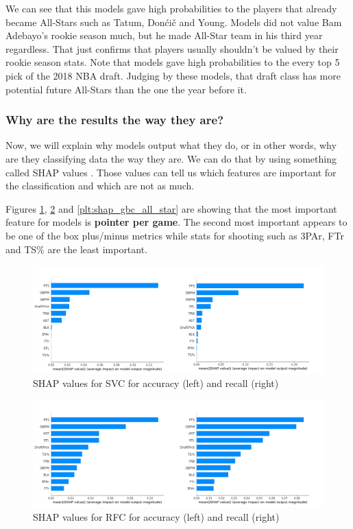 \documentclass[a4paper]{article}
\begin{document}
We can see that this models gave high probabilities to the players that already became All-Stars such as Tatum, Donćič and Young. Models did not value Bam Adebayo's rookie season much, but he made All-Star team in his third year regardless. That just confirms that players usually shouldn't be valued by their rookie season stats. Note that models gave high probabilities to the every top 5 pick of the 2018 NBA draft. Judging by these models, that draft class has more potential future All-Stars than the one the year before it.

\subsubsection{Why are the results the way they are?}
\label{subsubsec:shap_values_all_star}

Now, we will explain why models output what they do, or in other words, why are they classifying data the way they are. We can do that by using something called SHAP values \cite{shap}. Those values can tell us which features are important for the classification and which are not as much. 

Figures \ref{plt:shap_svm_all_star}, \ref{plt:shap_rfc_all_star} and \ref{plt:shap_gbc_all_star} are showing that the most important feature for models is \textbf{pointer per game}. The second most important appears to be one of the box plus/minus metrics while stats for shooting such as 3PAr, FTr and TS\% are the least important. 

\begin{figure}[h!]
\begin{center}
\includegraphics[scale=0.3]{svm_shap.png}
\end{center}
\caption{SHAP values for SVC for accuracy (left) and recall (right)}
\label{plt:shap_svm_all_star}
\end{figure}

\begin{figure}[h!]
\begin{center}
\includegraphics[scale=0.3]{rfc_shap.png}
\end{center}
\caption{SHAP values for RFC for accuracy (left) and recall (right)}
\label{plt:shap_rfc_all_star}
\end{figure}
\end{document}
